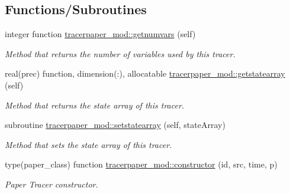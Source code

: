 \subsection*{Functions/\+Subroutines}
\begin{DoxyCompactItemize}
\item 
integer function \mbox{\hyperlink{namespacetracerpaper__mod_a62f88159b0746351f3b3a09a6a9dfff4}{tracerpaper\+\_\+mod\+::getnumvars}} (self)
\begin{DoxyCompactList}\small\item\em Method that returns the number of variables used by this tracer. \end{DoxyCompactList}\item 
real(prec) function, dimension(\+:), allocatable \mbox{\hyperlink{namespacetracerpaper__mod_a703693333469e5091ec8de0a62171294}{tracerpaper\+\_\+mod\+::getstatearray}} (self)
\begin{DoxyCompactList}\small\item\em Method that returns the state array of this tracer. \end{DoxyCompactList}\item 
subroutine \mbox{\hyperlink{namespacetracerpaper__mod_abda951b1d3a953fc25f24ee3ce8e2025}{tracerpaper\+\_\+mod\+::setstatearray}} (self, state\+Array)
\begin{DoxyCompactList}\small\item\em Method that sets the state array of this tracer. \end{DoxyCompactList}\item 
type(paper\+\_\+class) function \mbox{\hyperlink{namespacetracerpaper__mod_ad1bbc9d4e889b6aab71f0333cf6a5365}{tracerpaper\+\_\+mod\+::constructor}} (id, src, time, p)
\begin{DoxyCompactList}\small\item\em Paper Tracer constructor. \end{DoxyCompactList}\end{DoxyCompactItemize}
